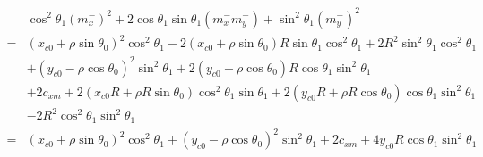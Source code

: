 \documentclass[12pt]{article}
\begin{document}
\begin{align}
    &\cos^2\theta_1(m_x^-)^2 + 2\cos\theta_1\sin\theta_1 (m_x^-m_y^-)  + \sin^2\theta_1(m_y^-)^2\\
    =& (x_{c0}+\rho\sin\theta_0)^2\cos^2\theta_1 -2(x_{c0}+\rho\sin\theta_0)R\sin\theta_1\cos^2\theta_1  +2R^2\sin^2\theta_1\cos^2\theta_1 \nonumber\\
    &+  (y_{c0}- \rho\cos\theta_0)^2\sin^2\theta_1 + 2(y_{c0}- \rho\cos\theta_0)R\cos\theta_1\sin^2\theta_1 \nonumber\\
    &+ 2c_{xm} + 2(x_{c0}R + \rho R\sin\theta_0)\cos^2\theta_1\sin\theta_1 + 2(y_{c0}R + \rho R\cos\theta_0)\cos\theta_1\sin^2\theta_1 \nonumber\\
    &- 2R^2\cos^2\theta_1\sin^2\theta_1 \\
    =& (x_{c0}+\rho\sin\theta_0)^2\cos^2\theta_1 +  (y_{c0}- \rho\cos\theta_0)^2\sin^2\theta_1 + 2c_{xm} + 4y_{c0}R\cos\theta_1\sin^2\theta_1
\end{align}
\end{document}
